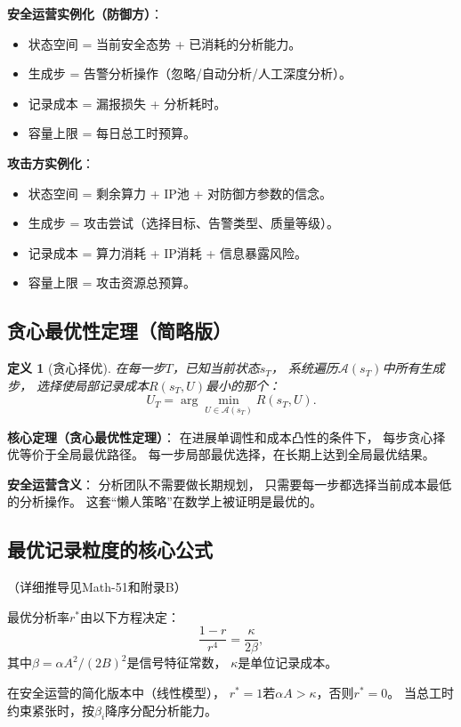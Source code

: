 \documentclass[11pt,a4paper]{article}
\newtheorem{definition}{定义}[section]
\begin{document}
\textbf{安全运营实例化（防御方）}：
\begin{itemize}
    \item 状态空间 = 当前安全态势 + 已消耗的分析能力。
    \item 生成步 = 告警分析操作（忽略/自动分析/人工深度分析）。
    \item 记录成本 = 漏报损失 + 分析耗时。
    \item 容量上限 = 每日总工时预算。
\end{itemize}

\textbf{攻击方实例化}：
\begin{itemize}
    \item 状态空间 = 剩余算力 + IP池 + 对防御方参数的信念。
    \item 生成步 = 攻击尝试（选择目标、告警类型、质量等级）。
    \item 记录成本 = 算力消耗 + IP消耗 + 信息暴露风险。
    \item 容量上限 = 攻击资源总预算。
\end{itemize}

\subsection{贪心最优性定理（简略版）}

\begin{definition}[贪心择优]
在每一步$T$，已知当前状态$s_T$，
系统遍历$\mathcal{A}(s_T)$中所有生成步，
选择使局部记录成本$R(s_T, U)$最小的那个：
\[
U_T = \arg\min_{U \in \mathcal{A}(s_T)} R(s_T, U).
\]
\end{definition}

\textbf{核心定理（贪心最优性定理）}：
在进展单调性和成本凸性的条件下，
每步贪心择优等价于全局最优路径。
每一步局部最优选择，在长期上达到全局最优结果。

\textbf{安全运营含义}：
分析团队不需要做长期规划，
只需要每一步都选择当前成本最低的分析操作。
这套“懒人策略”在数学上被证明是最优的。

\subsection{最优记录粒度的核心公式}

（详细推导见Math-51和附录B）

最优分析率$r^*$由以下方程决定：
\[
\frac{1-r}{r^4} = \frac{\kappa}{2\beta},
\]
其中$\beta = \alpha A^2 / (2B)^2$是信号特征常数，
$\kappa$是单位记录成本。

在安全运营的简化版本中（线性模型），
$r^* = 1$若$\alpha A > \kappa$，否则$r^* = 0$。
当总工时约束紧张时，按$\beta_i$降序分配分析能力。
\end{document}
